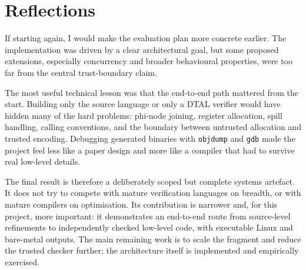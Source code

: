 \section{Reflections}
If starting again, I would make the evaluation plan more concrete earlier. The implementation was driven by a clear architectural goal, but some proposed extensions, especially concurrency and broader behavioural properties, were too far from the central trust-boundary claim.

The most useful technical lesson was that the end-to-end path mattered from the start. Building only the source language or only a DTAL verifier would have hidden many of the hard problems: phi-node joining, register allocation, spill handling, calling conventions, and the boundary between untrusted allocation and trusted encoding. Debugging generated binaries with \texttt{objdump} and \texttt{gdb} made the project feel less like a paper design and more like a compiler that had to survive real low-level details.

The final result is therefore a deliberately scoped but complete systems artefact. It does not try to compete with mature verification languages on breadth, or with mature compilers on optimisation. Its contribution is narrower and, for this project, more important: it demonstrates an end-to-end route from source-level refinements to independently checked low-level code, with executable Linux and bare-metal outputs. The main remaining work is to scale the fragment and reduce the trusted checker further; the architecture itself is implemented and empirically exercised.
